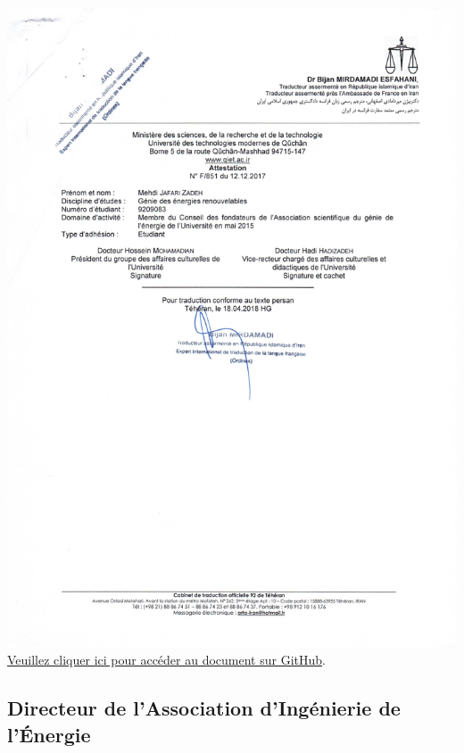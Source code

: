 \documentclass{article}
\begin{document}
        \begin{center}
            \includegraphics[width=\textwidth,height=\textheight,keepaspectratio]{../Document/Work Experience/Founder of the Energy Engineering Association/12-12-2017 attestation.jpg}
            \footnotesize
             \href{https://github.com/jafarizadeh/CV---lettre/tree/079f60796b41475881d7ba4a70abc3254d3dd466/Document/Work%20Experience/Founder%20of%20the%20Energy%20Engineering%20Association}{Veuillez cliquer ici pour accéder au document sur GitHub}.
        \end{center}

    \subsection{Directeur de l'Association d'Ingénierie de l'Énergie}
\end{document}
